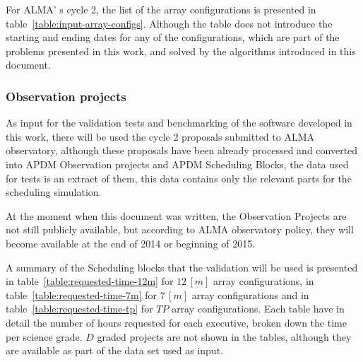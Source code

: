 For ALMA' s cycle 2, the list of the array configurations is presented in table~\ref{table:input-array-configs}. Although the table does not introduce the starting and ending dates for any of the configurations, which are part of the problems presented in this work, and solved by the algorithms introduced in this document.


\subsubsection{Observation projects}
As input for the validation tests and benchmarking of the software developed in this work, there will be used the cycle 2 proposals submitted to ALMA observatory, although these proposals have been already processed and converted into APDM Observation projects and APDM Scheduling Blocks, the data used for tests is an extract of them, this data contains only the relevant parts for the scheduling simulation.

At the moment when this document was written, the Observation Projects are not still publicly available, but according to ALMA observatory policy, they will become available at the end of 2014 or beginning of 2015. 

A summary of the Scheduling blocks that the validation will be used is presented in table~\ref{table:requested-time-12m} for $12\,[m]$ array configurations, in table~\ref{table:requested-time-7m} for $7\,[m]$ array configurations and in table~\ref{table:requested-time-tp} for $TP$  array configurations. Each table have in detail the number of hours requested for each executive, broken down the time per science grade. $D$ graded projects are not shown in the tables, although they are available as part of the data set used as input.

